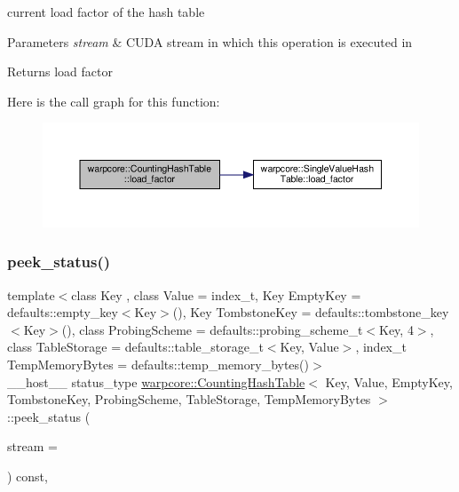 current load factor of the hash table 


\begin{DoxyParams}{Parameters}
{\em stream} & C\+U\+DA stream in which this operation is executed in \\
\hline
\end{DoxyParams}
\begin{DoxyReturn}{Returns}
load factor 
\end{DoxyReturn}
Here is the call graph for this function\+:
\nopagebreak
\begin{figure}[H]
\begin{center}
\leavevmode
\includegraphics[width=350pt]{classwarpcore_1_1CountingHashTable_aab45751b9ecffd2a8cd2b822cab26467_cgraph}
\end{center}
\end{figure}
\mbox{\label{classwarpcore_1_1CountingHashTable_ae9e388f29dae1952c2da7fed32415e35}} 
\subsubsection{\texorpdfstring{peek\+\_\+status()}{peek\_status()}}
{\footnotesize\ttfamily template$<$class Key , class Value  = index\+\_\+t, Key Empty\+Key = defaults\+::empty\+\_\+key$<$\+Key$>$(), Key Tombstone\+Key = defaults\+::tombstone\+\_\+key$<$\+Key$>$(), class Probing\+Scheme  = defaults\+::probing\+\_\+scheme\+\_\+t$<$\+Key, 4$>$, class Table\+Storage  = defaults\+::table\+\_\+storage\+\_\+t$<$\+Key, Value$>$, index\+\_\+t Temp\+Memory\+Bytes = defaults\+::temp\+\_\+memory\+\_\+bytes()$>$ \\
\+\_\+\+\_\+host\+\_\+\+\_\+ status\+\_\+type \hyperlink{classwarpcore_1_1CountingHashTable}{warpcore\+::\+Counting\+Hash\+Table}$<$ Key, Value, Empty\+Key, Tombstone\+Key, Probing\+Scheme, Table\+Storage, Temp\+Memory\+Bytes $>$\+::peek\+\_\+status (\begin{DoxyParamCaption}\item[{cuda\+Stream\+\_\+t}]{stream = {} }\end{DoxyParamCaption}) const\hspace{0.3cm}{\ttfamily [inline]}, {\ttfamily [noexcept]}}



